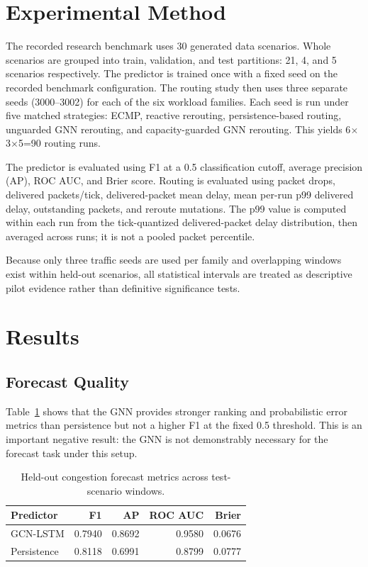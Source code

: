 \documentclass[conference]{IEEEtran}
\begin{document}
\section{Experimental Method}
The recorded research benchmark uses 30 generated data scenarios. Whole scenarios are grouped into train, validation, and test partitions: 21, 4, and 5 scenarios respectively. The predictor is trained once with a fixed seed on the recorded benchmark configuration. The routing study then uses three separate seeds (3000--3002) for each of the six workload families. Each seed is run under five matched strategies: ECMP, reactive rerouting, persistence-based routing, unguarded GNN rerouting, and capacity-guarded GNN rerouting. This yields 6$\times$3$\times$5=90 routing runs.

The predictor is evaluated using F1 at a 0.5 classification cutoff, average precision (AP), ROC AUC, and Brier score. Routing is evaluated using packet drops, delivered packets/tick, delivered-packet mean delay, mean per-run p99 delivered delay, outstanding packets, and reroute mutations. The p99 value is computed within each run from the tick-quantized delivered-packet delay distribution, then averaged across runs; it is not a pooled packet percentile.

Because only three traffic seeds are used per family and overlapping windows exist within held-out scenarios, all statistical intervals are treated as descriptive pilot evidence rather than definitive significance tests.

\section{Results}
\subsection{Forecast Quality}
Table~\ref{tab:prediction} shows that the GNN provides stronger ranking and probabilistic error metrics than persistence but not a higher F1 at the fixed 0.5 threshold. This is an important negative result: the GNN is not demonstrably necessary for the forecast task under this setup.

\begin{table}[t]
\centering
\caption{Held-out congestion forecast metrics across test-scenario windows.}
\label{tab:prediction}
\small
\begin{tabular}{lrrrr}
\toprule
Predictor & F1 & AP & ROC AUC & Brier\\
\midrule
GCN-LSTM & 0.7940 & 0.8692 & 0.9580 & 0.0676\\
Persistence & 0.8118 & 0.6991 & 0.8799 & 0.0777\\
\bottomrule
\end{tabular}
\end{table}
\end{document}
